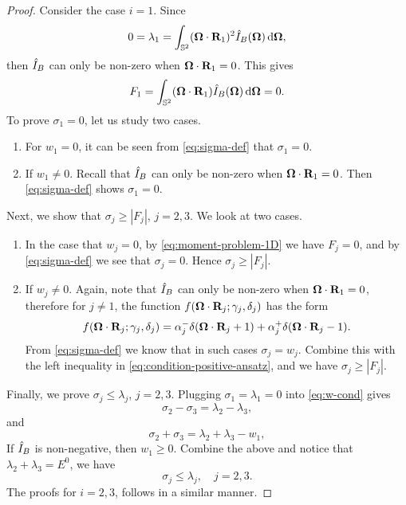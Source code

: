 \begin{proof}
  Consider the case $i=1$. Since
  \begin{equation}\label{eq:cond-lambda-zero}
    0 = \lambda_1 = \int_{\bbS^2} (\bOmega \cdot \bR_1)^2
    \bansatz(\bOmega) \dd \bOmega,
  \end{equation}
  then $\hat I_B$ can only be non-zero when $\boldsymbol{\Omega} \cdot \mathbf{R}_1 = 0$.
  This gives
  \[
    F_1 = \int_{\mathbb{S}^2} (\boldsymbol{\Omega} \cdot \mathbf{R}_1) \hat I_B(\boldsymbol{\Omega})
    \,{\rm d} \boldsymbol{\Omega} = 0.
  \]
  To prove $\sigma_1 = 0$, let us study two cases.  
  \begin{enumerate}
    \item For $w_1 = 0$, it can be seen from \eqref{eq:sigma-def} 
      that $\sigma_1 = 0$.
    \item If $w_1 \not= 0$. Recall that $\hat I_B$ can only be non-zero when 
      $\boldsymbol{\Omega} \cdot \mathbf{R}_1 = 0$. Then \eqref{eq:sigma-def} shows $\sigma_1 = 0$. 
  \end{enumerate}
  
  Next, we show that $\sigma_j \geq |F_j|$, $j = 2,3$. We look at 
  two cases.
  \begin{enumerate}
    \item In the case that $w_j = 0$, by \eqref{eq:moment-problem-1D} we
      have $F_j = 0$, and by \eqref{eq:sigma-def} we see that $\sigma_j = 0$.
      Hence $\sigma_j \geq |F_j|$.
    \item If $w_j \not= 0$. Again, note that $\hat I_B$ can only be non-zero 
      when $\boldsymbol{\Omega} \cdot \mathbf{R}_1 = 0$, therefore for $j \not= 1$,
      the function $f(\boldsymbol{\Omega}\cdot\mathbf{R}_j; \gamma_j, \delta_j)$
      has the form 
      $$f(\boldsymbol{\Omega}\cdot\mathbf{R}_j; \gamma_j, \delta_j) = \alpha_j^-
      \delta(\boldsymbol{\Omega} \cdot \mathbf{R}_j + 1) + \alpha_j^+ \delta(\boldsymbol{\Omega} \cdot \mathbf{R}_j - 1).$$
      From \eqref{eq:sigma-def} we know that in such cases $\sigma_j = w_j$. 
      Combine this with the left inequality in 
      \eqref{eq:condition-positive-ansatz}, and we have $\sigma_j \geq |F_j|$.
  \end{enumerate}

  Finally, we prove $\sigma_j \leq \lambda_j$, $j = 2,3$. 
  Plugging $\sigma_1 = \lambda_1 = 0$ into \eqref{eq:w-cond} gives
  \[
    \sigma_2 - \sigma_3 = \lambda_2 - \lambda_3,
  \]
  and
  \[
    \sigma_2 + \sigma_3 = \lambda_2 + \lambda_3 - w_1,
  \]
  If $\hat I_B$ is non-negative, then $w_1 \geq 0$. Combine the above and notice
  that $\lambda_2 + \lambda_3 = E^0$, we have
  \[
    \sigma_j \leq \lambda_j, \quad j = 2,3.
  \]
  The proofs for $i=2,3$, follows in a similar manner.
\end{proof}
